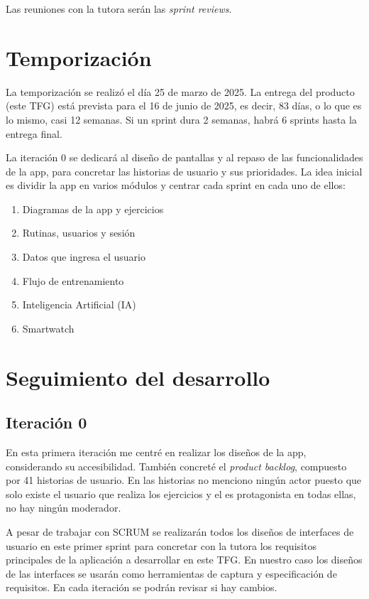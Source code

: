Las reuniones con la tutora serán las \textit{sprint reviews}.

\section{Temporización}
La temporización se realizó el día 25 de marzo de 2025. La entrega del producto (este TFG) está prevista para el 16 de junio de 2025, es decir, 83 días, o lo que es lo mismo, casi 12 semanas. Si un sprint dura 2 semanas, habrá 6 sprints hasta la entrega final.

La iteración 0 se dedicará al diseño de pantallas y al repaso de las funcionalidades de la app, para concretar las historias de usuario y sus prioridades. La idea inicial es dividir la app en varios módulos y centrar cada sprint en cada uno de ellos:

\begin{enumerate}
  \item Diagramas de la app y ejercicios
  \item Rutinas, usuarios y sesión
  \item Datos que ingresa el usuario
  \item Flujo de entrenamiento
  \item Inteligencia Artificial (IA)
  \item Smartwatch
\end{enumerate}

\section{Seguimiento del desarrollo}

\subsection{Iteración 0}
En esta primera iteración me centré en realizar los diseños de la app, considerando su accesibilidad. También concreté el \textit{product backlog}, compuesto por 41 historias de usuario. En las historias no menciono ningún actor puesto que solo existe el usuario que realiza los ejercicios y el es protagonista en todas ellas, no hay ningún moderador.

A pesar de trabajar con SCRUM se realizarán todos los diseños de interfaces de usuario en este primer sprint para concretar con la tutora los requisitos principales de la aplicación a desarrollar en este TFG. En nuestro caso los diseños de las interfaces se usarán como herramientas de captura y especificación de requisitos. En cada iteración se podrán revisar si hay cambios. 


